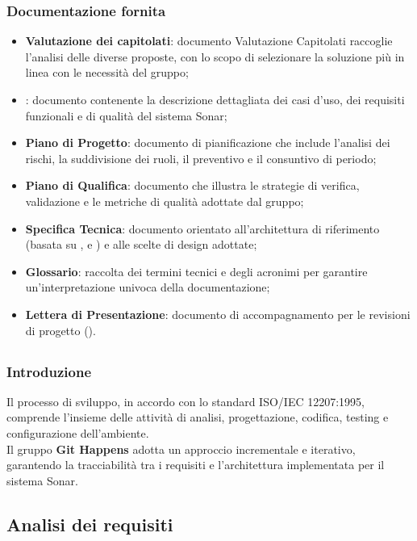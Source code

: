 \subsubsection{Documentazione fornita}
\begin{itemize}
    \item \textbf{Valutazione dei capitolati}: documento Valutazione Capitolati raccoglie l’analisi delle diverse proposte, con lo scopo di selezionare la soluzione più in linea con le necessità del gruppo;
    \item \textbf{}: documento contenente la descrizione dettagliata dei casi d'uso, dei requisiti funzionali e di qualità del sistema Sonar;
    \item \textbf{Piano di Progetto}: documento di pianificazione che include l'analisi dei rischi, la suddivisione dei ruoli, il preventivo e il consuntivo di periodo;
    \item \textbf{Piano di Qualifica}: documento che illustra le strategie di verifica, validazione e le metriche di qualità adottate dal gruppo;
    \item \textbf{Specifica Tecnica}: documento orientato all'architettura di riferimento (basata su ,  e ) e alle scelte di design adottate;
    \item \textbf{Glossario}: raccolta dei termini tecnici e degli acronimi per garantire un'interpretazione univoca della documentazione;
    \item \textbf{Lettera di Presentazione}: documento di accompagnamento per le revisioni di progetto ().
\end{itemize}

\subsection{}

\subsubsection{Introduzione}
Il processo di sviluppo, in accordo con lo standard ISO/IEC 12207:1995, comprende l'insieme delle attività di analisi, progettazione, codifica, testing e configurazione dell'ambiente. \\
Il gruppo \textbf{Git Happens} adotta un approccio incrementale e iterativo, garantendo la tracciabilità tra i requisiti e l'architettura implementata per il sistema Sonar.
\subsection{Analisi dei requisiti}

